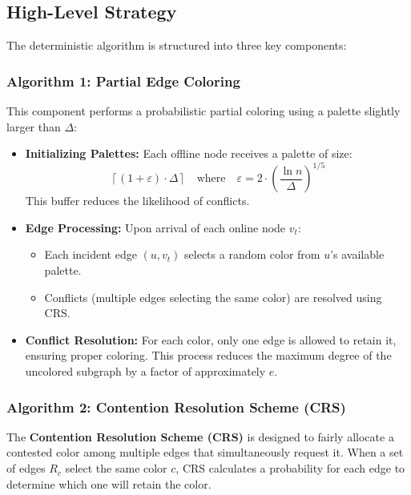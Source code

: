 \documentclass[11pt]{article}
\begin{document}
\subsection*{High-Level Strategy}
The deterministic algorithm is structured into three key components:

\subsubsection*{Algorithm 1: Partial Edge Coloring}
This component performs a probabilistic partial coloring using a palette slightly larger than $\Delta$:

\begin{itemize}
    \item \textbf{Initializing Palettes:} Each offline node receives a palette of size:
    \[
    \left\lceil (1 + \varepsilon) \cdot \Delta \right\rceil
    \quad \text{where} \quad \varepsilon = 2 \cdot \left( \frac{\ln n}{\Delta} \right)^{1/5}
    \]
    This buffer reduces the likelihood of conflicts.
    
    \item \textbf{Edge Processing:} Upon arrival of each online node $v_t$:
    \begin{itemize}
        \item Each incident edge $(u, v_t)$ selects a random color from $u$'s available palette.
        \item Conflicts (multiple edges selecting the same color) are resolved using CRS.
    \end{itemize}
    
    \item \textbf{Conflict Resolution:} For each color, only one edge is allowed to retain it, ensuring proper coloring. This process reduces the maximum degree of the uncolored subgraph by a factor of approximately $e$.
\end{itemize}

\subsubsection*{Algorithm 2: Contention Resolution Scheme (CRS)}

The \textbf{Contention Resolution Scheme (CRS)} is designed to fairly allocate a contested color among multiple edges that simultaneously request it. When a set of edges $R_c$ select the same color $c$, CRS calculates a probability for each edge to determine which one will retain the color.
\end{document}
